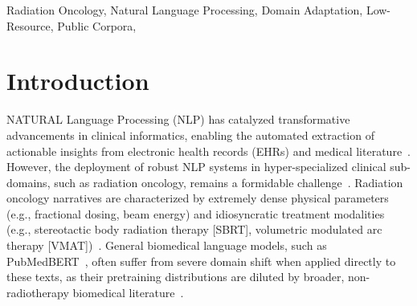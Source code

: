 \documentclass[a4paper,fleqn]{cas-dc}
\begin{document}


\begin{keywords}
Radiation Oncology\sep
Natural Language Processing\sep
Domain Adaptation\sep
Low-Resource\sep 
Public Corpora\sep
\end{keywords}

\maketitle

\section{Introduction}\label{sec:introduction}
\iffalse
NATURAL Language Processing (NLP) has catalyzed transformative advancements in clinical informatics, enabling the automated extraction of actionable insights from electronic health records (EHRs) and medical literature~\cite{thirunavukarasu2023large, bilal2025nlp}. However, the deployment of robust NLP systems in hyper-specialized clinical sub-domains, such as radiation oncology, remains a formidable challenge~\cite{khanmohammadi2025integrating, lin2024natural}. Radiation oncology narratives are characterized by extremely dense physical parameters (e.g., fractional dosing, beam energy) and idiosyncratic treatment modalities (e.g., stereotactic body radiation therapy [SBRT], volumetric modulated arc therapy [VMAT])~\cite{huang2024unsupervised}. General biomedical language models, such as PubMedBERT~\cite{gu2021domain}, often suffer from severe domain shift when applied directly to these texts, as their pretraining distributions are diluted by broader, non-radiotherapy biomedical literature~\cite{laparra2021review}.
\end{document}
